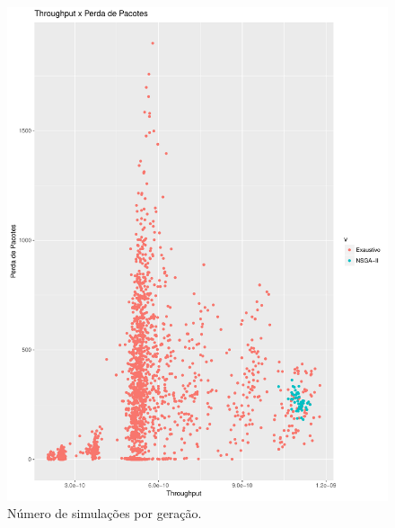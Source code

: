 \documentclass[conference]{IEEEtran}
\begin{document}
\begin{figure}[h]
  \centering
  \includegraphics[scale=0.30]{figures/ExaustivoXNsgaii_ThroughputXPerdaPacotes.pdf}
  \caption{Número de simulações por geração.}
  \label{fig:result-sim}
\end{figure}
\end{document}
